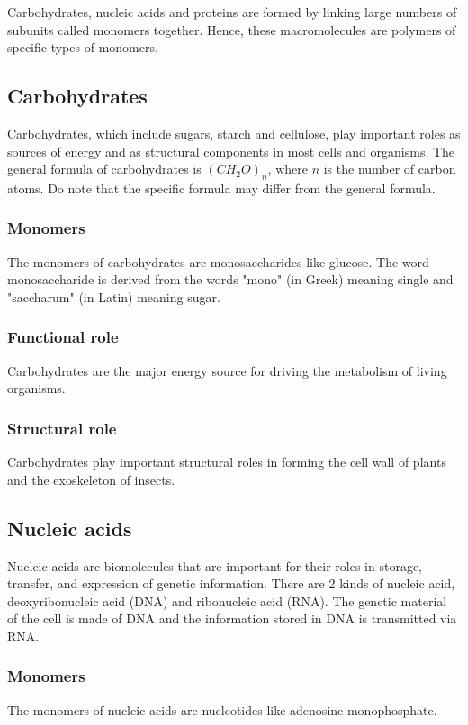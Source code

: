 \documentclass[11pt]{article}
\begin{document}
Carbohydrates, nucleic acids and proteins are formed by linking large numbers of subunits called monomers together. Hence, these macromolecules are polymers of specific types of monomers.

\subsection{Carbohydrates}
\label{sec:org351e2bc}
Carbohydrates, which include sugars, starch and cellulose, play important roles as sources of energy and as structural components in most cells and organisms. The general formula of carbohydrates is \((CH_2O)_n\), where \(n\) is the number of carbon atoms. Do note that the specific formula may differ from the general formula.

\subsubsection{Monomers}
\label{sec:org0cc886f}
The monomers of carbohydrates are monosaccharides like glucose. The word monosaccharide is derived from the words "mono" (in Greek) meaning single and "saccharum" (in Latin) meaning sugar.

\subsubsection{Functional role}
\label{sec:orgb182519}
Carbohydrates are the major energy source for driving the metabolism of living organisms.

\subsubsection{Structural role}
\label{sec:org42f9c43}
Carbohydrates play important structural roles in forming the cell wall of plants and the exoskeleton of insects.

\subsection{Nucleic acids}
\label{sec:org7856847}
Nucleic acids are biomolecules that are important for their roles in storage, transfer, and expression of genetic information. There are 2 kinds of nucleic acid, deoxyribonucleic acid (DNA) and ribonucleic acid (RNA). The genetic material of the cell is made of DNA and the information stored in DNA is transmitted via RNA.

\subsubsection{Monomers}
\label{sec:orgbe124d9}
The monomers of nucleic acids are nucleotides like adenosine monophosphate.
\end{document}
